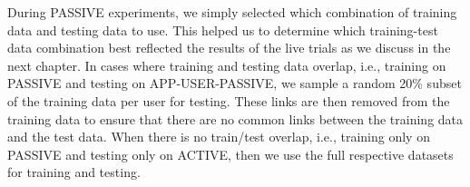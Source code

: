 During PASSIVE experiments, we simply selected which combination of
training data and testing data to use.  This helped us to determine
which training-test data combination best reflected the results of the
live trials as we discuss in the next chapter.
In cases where training and testing data overlap, i.e., training on
PASSIVE and testing on APP-USER-PASSIVE, we sample a random 20\%
subset of the training data per user for testing. These links are then
removed from the training data to ensure that there are no common
links between the training data and the test data.  When there is no
train/test overlap, i.e., training only on PASSIVE and testing only on
ACTIVE, then we use the full respective datasets for training and
testing.
